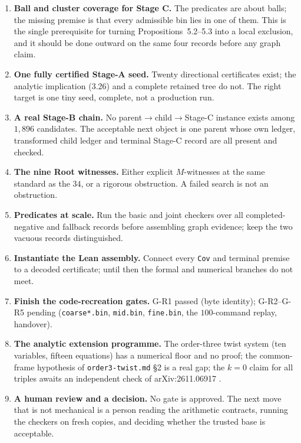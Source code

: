 \documentclass[10pt]{article}
\theoremstyle{definition}
\newcommand{\file}[1]{\texttt{\small #1}}
\begin{document}
\begin{enumerate}[label=\textbf{O\arabic*.},leftmargin=2.2em,itemsep=1pt]
\item \textbf{Ball and cluster coverage for Stage C.} The predicates are about balls; the missing
premise is that every admissible bin lies in one of them. This is the single prerequisite for turning
Propositions~5.2--5.3 into a local exclusion, and it should be done outward on the same four records
before any graph claim.
\item \textbf{One fully certified Stage-A seed.} Twenty directional certificates exist; the analytic
implication (3.26) and a complete retained tree do not. The right target is one tiny seed, complete,
not a production run.
\item \textbf{A real Stage-B chain.} No parent$\to$child$\to$Stage-C instance exists among $1{,}896$
candidates. The acceptable next object is one parent whose own ledger, transformed child ledger and
terminal Stage-C record are all present and checked.
\item \textbf{The nine Root witnesses.} Either explicit $M$-witnesses at the same standard as the
$34$, or a rigorous obstruction. A failed search is not an obstruction.
\item \textbf{Predicates at scale.} Run the basic and joint checkers over all completed-negative and
fallback records before assembling graph evidence; keep the two vacuous records distinguished.
\item \textbf{Instantiate the Lean assembly.} Connect every \texttt{Cov} and terminal premise to a
decoded certificate; until then the formal and numerical branches do not meet.
\item \textbf{Finish the code-recreation gates.} G-R1 passed (byte identity); G-R2--G-R5 pending
(\file{coarse*.bin}, \file{mid.bin}, \file{fine.bin}, the $100$-command replay, handover).
\item \textbf{The analytic extension programme.} The order-three twist system (ten variables, fifteen
equations) has a numerical floor and no proof; the common-frame hypothesis of \file{order3-\allowbreak{}twist.md}
\S2 is a real gap; the $k=0$ claim for all triples awaits an independent check of arXiv:2611.06917 \cite{wuttig26}.
\item \textbf{A human review and a decision.} No gate is approved. The next move that is not
mechanical is a person reading the arithmetic contracts, running the checkers on fresh copies, and
deciding whether the trusted base is acceptable.
\end{enumerate}
\end{document}
